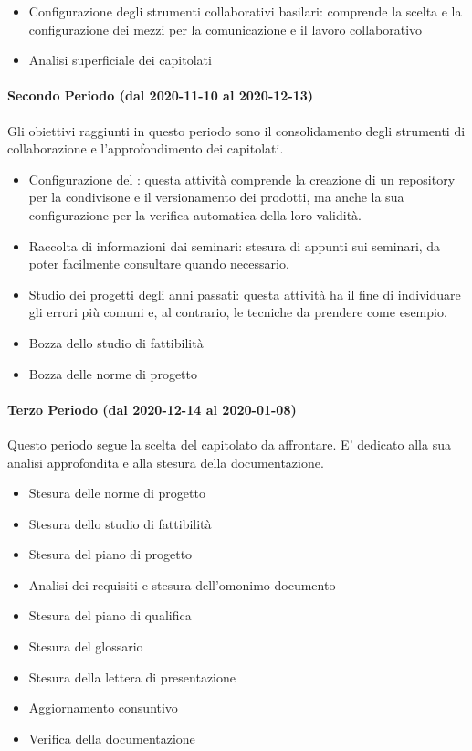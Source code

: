 \begin{itemize}
	\item Configurazione degli strumenti collaborativi basilari: comprende la scelta e la configurazione dei mezzi per la comunicazione e il lavoro collaborativo
	\item Analisi superficiale dei capitolati
	
\end{itemize}

\paragraph{Secondo Periodo (dal 2020-11-10 al 2020-12-13)}
Gli obiettivi raggiunti in questo periodo sono il consolidamento degli strumenti di collaborazione e l'approfondimento dei capitolati.
\begin{itemize}
	\item Configurazione del : questa attività comprende la creazione di un repository per la condivisone e il versionamento dei prodotti, ma anche la sua configurazione per la verifica automatica della loro validità.
	\item Raccolta di informazioni dai seminari: stesura di appunti sui seminari, da poter facilmente consultare quando necessario.
	\item Studio dei progetti degli anni passati: questa attività ha il fine di individuare gli errori più comuni e, al contrario, le tecniche da prendere come esempio.
	\item Bozza dello studio di fattibilità
	\item Bozza delle norme di progetto
\end{itemize}

\paragraph{Terzo Periodo (dal 2020-12-14 al 2020-01-08)}
Questo periodo segue la scelta del capitolato da affrontare. E' dedicato alla sua analisi approfondita e alla stesura della documentazione. 
\begin{itemize}
	\item Stesura delle norme di progetto
	\item Stesura dello studio di fattibilità
	\item Stesura del piano di progetto
	\item Analisi dei requisiti e stesura dell'omonimo documento
	\item Stesura del piano di qualifica
	\item Stesura del glossario
	\item Stesura della lettera di presentazione
	\item Aggiornamento consuntivo
	\item Verifica della documentazione
\end{itemize}

